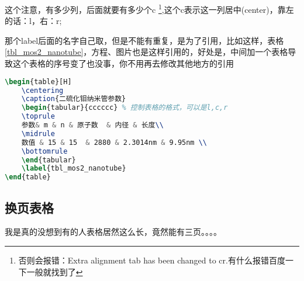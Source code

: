 \documentclass[AutoFakeBold]{LZUThesis}
\begin{document}
这个注意，有多少列，后面就要有多少个c \footnote{否则会报错：Extra alignment tab has been changed to cr.有什么报错百度一下一般就找到了},这个c表示这一列居中(center)，靠左的话：l，右：r;

那个label后面的名字自己取，但是不能有重复，是为了引用，比如这样，表格\ref{tbl_mos2_nanotube}，方程、图片也是这样引用的，好处是，中间加一个表格导致这个表格的序号变了也没事，你不用再去修改其他地方的引用

\begin{lstlisting}[language = tex]
\begin{table}[H]
    \centering
    \caption{二硫化钼纳米管参数}
    \begin{tabular}{cccccc} % 控制表格的格式，可以是l,c,r
    \toprule
    参数& m & n & 原子数  & 内径 & 长度\\
    \midrule
    数值 & 15 & 15  & 2880 & 2.3014nm & 9.95nm \\
    \bottomrule
    \end{tabular}
    \label{tbl_mos2_nanotube}
\end{table}
\end{lstlisting}

\subsection{换页表格} %

我是真的没想到有的人表格居然这么长，竟然能有三页。。。。
\end{document}
